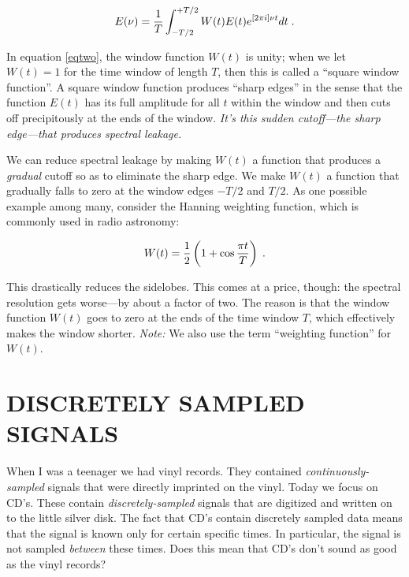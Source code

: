 \documentclass[11pt,preprint]{aastex}
\begin{document}
\begin{equation}
E(\nu) = {1 \over T}
\int_{-T/2}^{+T/2} W(t) E(t) e^{[2 \pi i]\nu t}  dt \; .
\end{equation}

\noindent In equation \ref{eqtwo}, the window function $W(t)$ is unity;
when  we let $W(t) = 1$ for the time window of length $T$, then this is
called a ``square window function''.  A square window function produces 
``sharp edges'' in the sense that the function $E(t)$ has its full
amplitude for all $t$ within the window and then cuts off precipitously
at the ends of the window.  {\it It's this sudden cutoff---the sharp
edge---that produces spectral leakage.}

        We can reduce spectral leakage by making $W(t)$ a function that
produces a {\it gradual} cutoff so as to eliminate the sharp edge.  We
make $W(t)$ a function that gradually falls to zero at the window edges
$-T/2$ and $T/2$. As one possible example among many, consider the Hanning
weighting function, which is commonly used in radio astronomy:

\begin{equation}
W(t) = {1 \over 2} \left( 1 + \cos{\pi t \over T} \right) \; .
\label{weighting}
\end{equation}

\noindent This drastically reduces the sidelobes.  This comes at a
price, though: the spectral resolution gets worse---by about a factor
of two.  The reason is that the window function $W(t)$ goes to zero
at the ends of the time window $T$, which effectively makes the window
shorter. {\it Note:} We also use the term ``weighting function'' for
$W(t)$.



\section{DISCRETELY SAMPLED SIGNALS}

	When I was a teenager we had vinyl records.  They contained {\it
continuously-sampled} signals that were directly imprinted on the vinyl. 
Today we focus on CD's.  These contain {\it discretely-sampled} signals
that are digitized and written on to the little silver disk.  The fact
that CD's contain discretely sampled data means that the signal is known
only for certain specific times.  In particular, the signal is not
sampled {\it between} these times.  Does this mean that CD's don't sound
as good as the vinyl records?
\end{document}
